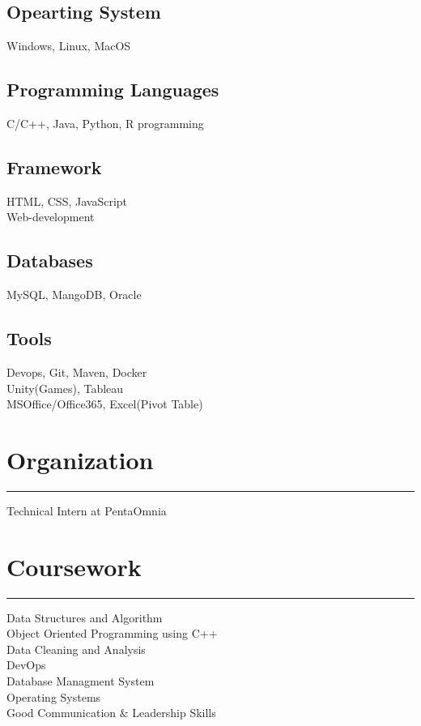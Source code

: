\documentclass[]{vishal-kathpalia}
\begin{document}
\begin{minipage}[t]{0.33\textwidth}
\subsection{Opearting System}
Windows, Linux, MacOS
\vspace{4pt}
\subsection{Programming Languages}
C/C++, Java, Python, R programming
\vspace{4pt}
\subsection{Framework}
HTML, CSS, JavaScript \\
Web-development
\vspace{4pt}
\subsection{Databases}
MySQL, MangoDB, Oracle
\vspace{4pt}
\subsection{Tools}
Devops, Git, Maven, Docker \\Unity(Games), Tableau\\
MSOffice/Office365, Excel(Pivot Table)
\sectionsep
\section{Organization}
\noindent\rule{5cm}{0.4pt}

Technical Intern at PentaOmnia
\section{Coursework}
\noindent\rule{5cm}{0.4pt}

Data Structures and Algorithm\\
Object Oriented Programming using C++\\
Data Cleaning and Analysis\\
DevOps \\
Database Managment System\\
Operating Systems\\
Good Communication $\&$ Leadership Skills
\sectionsep

\end{minipage}
\end{document}
